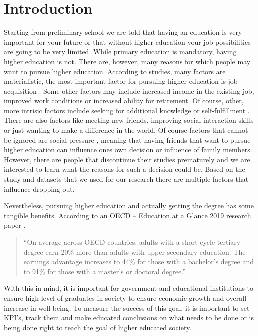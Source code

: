 \documentclass[
  letterpaper,
  DIV=11,
  numbers=noendperiod]{scrartcl}
\begin{document}
\hypertarget{introduction}{%
\section{Introduction}\label{introduction}}

Starting from preliminary school we are told that having an education is
very important for your future or that without higher education your job
possibilities are going to be very limited. While primary education is
mandatory, having higher education is not. There are, however, many
reasons for which people may want to pursue higher education. According
to studies, many factors are materialistic, the most important factor
for pursuing higher education is job acquisition
\autocite{knutsen_motivation_2011}. Some other factors may include
increased income in the existing job, improved work conditions or
increased ability for retirement. Of course, other, more intrisic
factors include seeking for additional knowledge or self-fulfillment
\autocite{cortes_factors_2023}. There are also factors like meeting new
friends, improving social interaction skills or just wanting to make a
difference in the world. Of course factors that cannot be ignored are
social pressure \autocite{temple_factors_2009}, meaning that having
friends that want to pursue higher education can influence ones own
decision or influence of family members. However, there are people that
discontinue their studies prematurely and we are interested to learn
what the reasons for such a decision could be. Based on the study and
datasets that we used for our research there are multiple factors that
influence dropping out.

Nevertheless, pursuing higher education and actually getting the degree
has some tangible benefits. According to an OECD -- Education at a
Glance 2019 research paper \autocite{oecd_education_2019}.

\begin{quote}
\enquote{On average across OECD countries, adults with a short-cycle
tertiary degree earn 20\% more than adults with upper secondary
education. The earnings advantage increases to 44\% for those with a
bachelor's degree and to 91\% for those with a master's or doctoral
degree.}
\end{quote}

With this in mind, it is important for government and educational
institutions to ensure high level of graduates in society to ensure
economic growth and overall increase in well-being. To measure the
success of this goal, it is important to set KPI's, track them and make
educated conclusions on what needs to be done or is being done right to
reach the goal of higher educated society.
\end{document}

